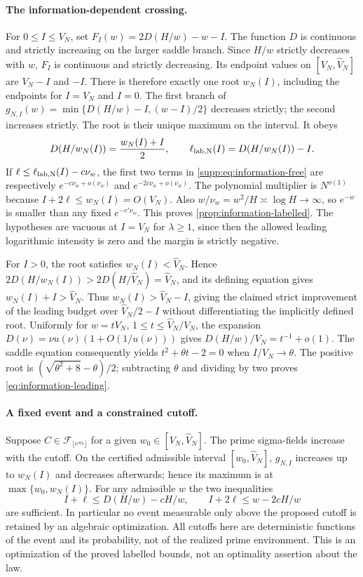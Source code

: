 \paragraph{The information-dependent crossing.}
For $0\le I\le V_N$, set $F_I(w)=2D(H/w)-w-I$.
The function $D$ is continuous and strictly increasing on the larger
saddle branch. Since $H/w$ strictly decreases with $w$, $F_I$ is
continuous and strictly decreasing. Its endpoint values on
$[V_N,\widehat V_N]$ are $V_N-I$ and $-I$.
There is therefore exactly one root $w_N(I)$, including the endpoints
for $I=V_N$ and $I=0$. The first branch of
$g_{N,I}(w)=\min\{D(H/w)-I,(w-I)/2\}$ decreases strictly; the second
increases strictly. The root is their unique maximum on the interval.
It obeys
\[
 D(H/w_N(I))=\frac{w_N(I)+I}{2},\qquad
 \ell_{\rm lab,N}(I)=D(H/w_N(I))-I.
\]
If $\ell\le\ell_{\rm lab,N}(I)-c\nu_w$, the first two terms in
\eqref{supp:eq:information-free} are respectively
$e^{-c\nu_w+o(\nu_w)}$ and $e^{-2c\nu_w+o(\nu_w)}$.
The polynomial multiplier is $N^{o(1)}$ because
$I+2\ell\le w_N(I)=O(V_N)$. Also $w/\nu_w=w^2/H\asymp\log H\to\infty$,
so $e^{-w}$ is smaller than any fixed $e^{-c'\nu_w}$.
This proves \cref{prop:information-labelled}. The hypotheses are
vacuous at $I=V_N$ for $\lambda\ge1$, since then the allowed leading
logarithmic intensity is zero and the margin is strictly negative.

For $I>0$, the root satisfies $w_N(I)<\widehat V_N$. Hence
$2D(H/w_N(I))>2D(H/\widehat V_N)=\widehat V_N$, and its defining
equation gives $w_N(I)+I>\widehat V_N$.
Thus $w_N(I)>\widehat V_N-I$, giving the claimed strict improvement
of the leading budget over $\widehat V_N/2-I$ without differentiating
the implicitly defined root.
Uniformly for $w=tV_N$, $1\le t\le\widehat V_N/V_N$, the expansion
$D(\nu)=\nu u(\nu)(1+O(1/u(\nu)))$ gives
$D(H/w)/V_N=t^{-1}+o(1)$. The saddle equation consequently yields
$t^2+\theta t-2=0$ when $I/V_N\to\theta$.
The positive root is $(\sqrt{\theta^2+8}-\theta)/2$; subtracting
$\theta$ and dividing by two proves \eqref{eq:information-leading}.

\paragraph{A fixed event and a constrained cutoff.}
Suppose $C\in\mathcal F_{\lfloor e^{w_0}\rfloor}$ for a given
$w_0\in[V_N,\widehat V_N]$. The prime sigma-fields increase with the
cutoff. On the certified admissible interval $[w_0,\widehat V_N]$,
$g_{N,I}$ increases up to $w_N(I)$ and decreases afterwards; hence its
maximum is at $\max\{w_0,w_N(I)\}$. For any admissible $w$ the two
inequalities
\[
 I+\ell\le D(H/w)-cH/w,\qquad
 I+2\ell\le w-2cH/w
\]
are sufficient. In particular no event measurable only above the proposed
cutoff is retained by an algebraic optimization. All cutoffs here are
deterministic functions of the event and its probability, not of the
realized prime environment. This is an optimization of the proved
labelled bounds, not an optimality assertion about the law.


